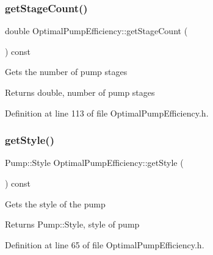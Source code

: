 \mbox{\label{class_optimal_pump_efficiency_aac0c1a4a6492bf00b245c2a61d100eaa}} 
\subsubsection{\texorpdfstring{get\+Stage\+Count()}{getStageCount()}\hspace{0.1cm}{\footnotesize\ttfamily [3/3]}}
{\footnotesize\ttfamily double Optimal\+Pump\+Efficiency\+::get\+Stage\+Count (\begin{DoxyParamCaption}{ }\end{DoxyParamCaption}) const\hspace{0.3cm}{\ttfamily [inline]}}

Gets the number of pump stages \begin{DoxyReturn}{Returns}
double, number of pump stages 
\end{DoxyReturn}


Definition at line 113 of file Optimal\+Pump\+Efficiency.\+h.

\mbox{\label{class_optimal_pump_efficiency_a601fe15e9acc23112743fabe417030fb}} 
\subsubsection{\texorpdfstring{get\+Style()}{getStyle()}\hspace{0.1cm}{\footnotesize\ttfamily [1/3]}}
{\footnotesize\ttfamily Pump\+::\+Style Optimal\+Pump\+Efficiency\+::get\+Style (\begin{DoxyParamCaption}{ }\end{DoxyParamCaption}) const\hspace{0.3cm}{\ttfamily [inline]}}

Gets the style of the pump \begin{DoxyReturn}{Returns}
Pump\+::\+Style, style of pump 
\end{DoxyReturn}


Definition at line 65 of file Optimal\+Pump\+Efficiency.\+h.

